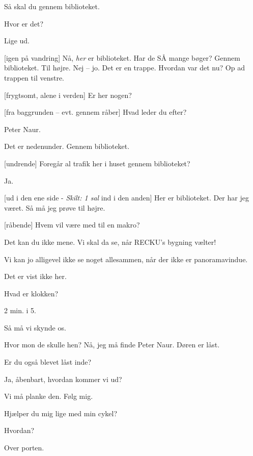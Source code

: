 \documentclass[a4paper,11pt]{article}
\begin{document}
\begin{sketch}
 Så skal du gennem biblioteket.

 Hvor er det?

 Lige ud.

[igen på vandring] Nå, {\em her} er biblioteket.  Har de SÅ
mange bøger?  Gennem biblioteket.  Til højre.  Nej --
jo.  Det er en trappe.  Hvordan var det nu?  Op ad
trappen til venstre.


[frygtsomt, alene i verden] Er her nogen?

[fra baggrunden -- evt. gennem råber] Hvad leder du efter?

 Peter Naur.

 Det er nedenunder.  Gennem biblioteket.

[undrende] Foregår al trafik her i huset gennem biblioteket?

 Ja.

[ud i den ene side - {\em Skilt: 1 sal} ind i den anden] Her
er biblioteket.  Der har jeg været.  Så må jeg prøve til højre.


[råbende] Hvem vil være med til en makro?

 Det kan du ikke mene.  Vi skal da se, når RECKU's bygning
vælter!

 Vi kan jo alligevel ikke se noget allesammen, når der ikke
er panoramavindue.

 Det er vist ikke her.

 Hvad er klokken?

 2 min. i 5.

 Så må vi skynde os.


 Hvor mon de skulle hen?  Nå, jeg må finde Peter Naur.
 Døren er låst. 

 Er du også blevet låst inde?

 Ja, åbenbart, hvordan kommer vi ud?

 Vi må planke den.  Følg mig.



 Hjælper du mig lige med min cykel?

 Hvordan?

 Over porten.


\end{sketch}
\end{document}
